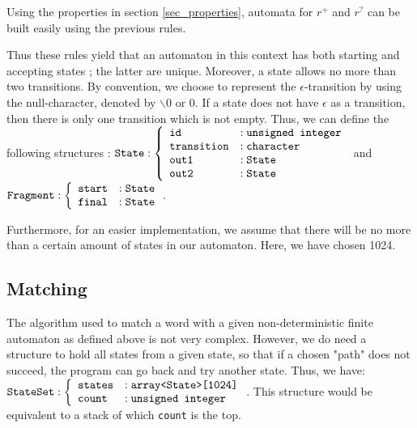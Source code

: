 \documentclass[a4paper,11pt,titlepage]{article}
\begin{document}
Using the properties in section \ref{sec_properties}, automata for $r^+$ and $r^?$ can be built easily using the previous rules.

Thus these rules yield that an automaton in this context has both starting and accepting states ; the latter are unique. Moreover, a state allows no more than two transitions. By convention, we choose to represent the $\epsilon$-transition by using the null-character, denoted by $\backslash0$ or $0$. If a state does not have $\epsilon$ as a transition, then there is only one transition which is not empty. Thus, we can define the following structures :
$\verb|State| : \left\{\begin{array}{ll}
    \verb|id| &:\verb|unsigned integer|\\
    \verb|transition| &:\verb|character|\\
    \verb|out1| &:\verb|State|\\
    \verb|out2| &:\verb|State|
\end{array}\right.$ and $\verb|Fragment| : \left\{\begin{array}{ll}
    \verb|start| &:\verb|State|\\
    \verb|final| &:\verb|State|
\end{array}\right.$. 

Furthermore, for an easier implementation, we assume that there will be no more than a certain amount of states in our automaton. Here, we have chosen 1024.

\subsection{Matching}

The algorithm used to match a word with a given non-deterministic finite automaton as defined above is not very complex. However, we do need a structure to hold all states from a given state, so that if a chosen "path" does not succeed, the program can go back and try another state. Thus, we have: $\verb|StateSet| : \left\{\begin{array}{ll}
    \verb|states| &:\verb|array<State>[1024]|\\
    \verb|count| &:\verb|unsigned integer|
\end{array}\right.$. This structure would be equivalent to a stack of which \verb|count| is the top.
\end{document}
